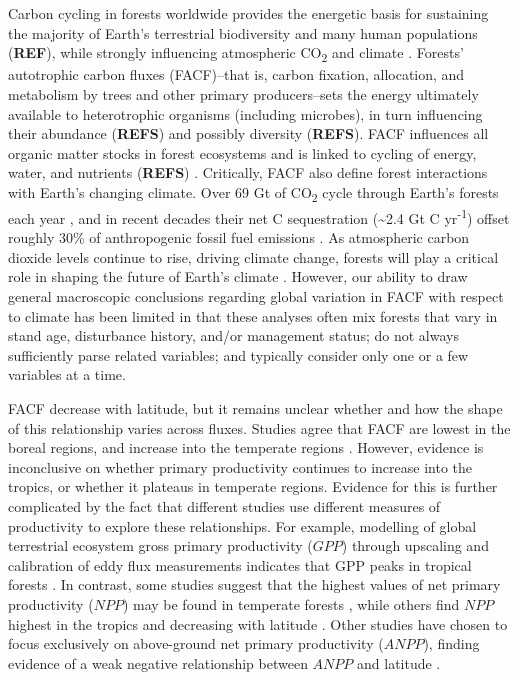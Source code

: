 \documentclass[]{article}
\begin{document}
Carbon cycling in forests worldwide provides the energetic basis for
sustaining the majority of Earth's terrestrial biodiversity and many
human populations (\textbf{REF}), while strongly influencing atmospheric
CO\textsubscript{2} and climate \citep{bonan_forests_2008}. Forests'
autotrophic carbon fluxes (FACF)--that is, carbon fixation, allocation,
and metabolism by trees and other primary producers--sets the energy
ultimately available to heterotrophic organisms (including microbes), in
turn influencing their abundance (\textbf{REFS}) and possibly diversity
\citep{waide_relationship_1999} (\textbf{REFS}). FACF influences all
organic matter stocks in forest ecosystems and is linked to cycling of
energy, water, and nutrients (\textbf{REFS}) \citep{piao_forest_2010}.
Critically, FACF also define forest interactions with Earth's changing
climate. Over 69 Gt of CO\textsubscript{2} cycle through Earth's forests
each year \citep{badgley_terrestrial_2019}, and in recent decades their
net C sequestration (\textasciitilde{}2.4 Gt C yr\textsuperscript{-1})
offset roughly 30\% of anthropogenic fossil fuel emissions
\citep{pan_large_2011}. As atmospheric carbon dioxide levels continue to
rise, driving climate change, forests will play a critical role in
shaping the future of Earth's climate
\citep{cavaleri_urgent_2015, rogelj_mitigation_2018}. However, our
ability to draw general macroscopic conclusions regarding global
variation in FACF with respect to climate has been limited in that these
analyses often mix forests that vary in stand age, disturbance history,
and/or management status; do not always sufficiently parse related
variables; and typically consider only one or a few variables at a time.

FACF decrease with latitude, but it remains unclear whether and how the
shape of this relationship varies across fluxes. Studies agree that FACF
are lowest in the boreal regions, and increase into the temperate
regions
\citep{luyssaert_co_2007, huston_global_2009, beer_terrestrial_2010, jung_global_2011}.
However, evidence is inconclusive on whether primary productivity
continues to increase into the tropics, or whether it plateaus in
temperate regions. Evidence for this is further complicated by the fact
that different studies use different measures of productivity to explore
these relationships. For example, modelling of global terrestrial
ecosystem gross primary productivity (\(GPP\)) through upscaling and
calibration of eddy flux measurements indicates that GPP peaks in
tropical forests
\citep{beer_terrestrial_2010, jung_global_2011, badgley_terrestrial_2019, li_mapping_2019}.
In contrast, some studies suggest that the highest values of net primary
productivity (\(NPP\)) may be found in temperate forests
\citep{luyssaert_co_2007, huston_global_2009}, while others find \(NPP\)
highest in the tropics and decreasing with latitude
\citep{simova_enigma_2017}. Other studies have chosen to focus
exclusively on above-ground net primary productivity (\(ANPP\)), finding
evidence of a weak negative relationship between \(ANPP\) and latitude
\citep{huston_global_2009, gillman_latitude_2015}.
\end{document}
